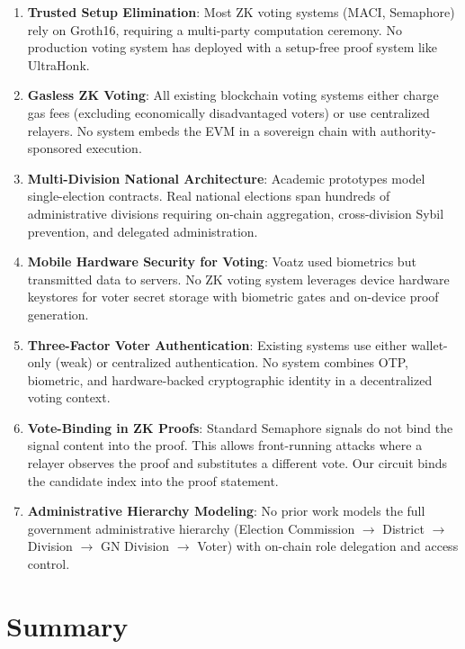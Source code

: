 \begin{enumerate}
    \item \textbf{Trusted Setup Elimination}: Most ZK voting systems (MACI, Semaphore) rely on Groth16, requiring a multi-party computation ceremony. No production voting system has deployed with a setup-free proof system like UltraHonk.
    
    \item \textbf{Gasless ZK Voting}: All existing blockchain voting systems either charge gas fees (excluding economically disadvantaged voters) or use centralized relayers. No system embeds the EVM in a sovereign chain with authority-sponsored execution.
    
    \item \textbf{Multi-Division National Architecture}: Academic prototypes model single-election contracts. Real national elections span hundreds of administrative divisions requiring on-chain aggregation, cross-division Sybil prevention, and delegated administration.
    
    \item \textbf{Mobile Hardware Security for Voting}: Voatz used biometrics but transmitted data to servers. No ZK voting system leverages device hardware keystores for voter secret storage with biometric gates and on-device proof generation.
    
    \item \textbf{Three-Factor Voter Authentication}: Existing systems use either wallet-only (weak) or centralized authentication. No system combines OTP, biometric, and hardware-backed cryptographic identity in a decentralized voting context.
    
    \item \textbf{Vote-Binding in ZK Proofs}: Standard Semaphore signals do not bind the signal content into the proof. This allows front-running attacks where a relayer observes the proof and substitutes a different vote. Our circuit binds the candidate index into the proof statement.
    
    \item \textbf{Administrative Hierarchy Modeling}: No prior work models the full government administrative hierarchy (Election Commission $\to$ District $\to$ Division $\to$ GN Division $\to$ Voter) with on-chain role delegation and access control.
\end{enumerate}

\section{Summary}


